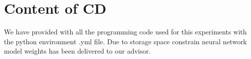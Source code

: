 
\chapter{Content of CD} %

\label{AppendixA} %
We have provided with all the programming code used for this experiments with the python environment .yml file. Due to storage space constrain neural network model weights has been delivered to our advisor.


